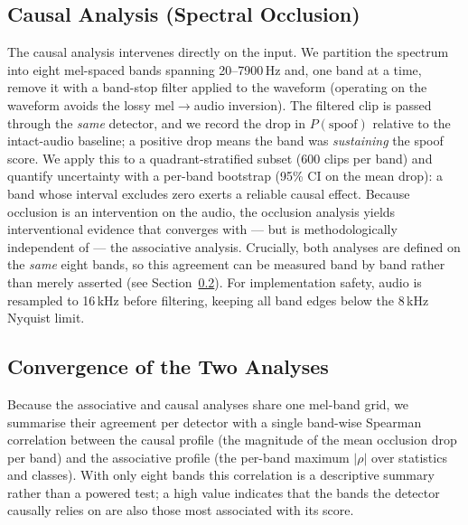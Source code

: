 \documentclass[sigconf]{acmart}
\begin{document}
\subsection{Causal Analysis (Spectral Occlusion)}
\label{subsec:occlusion}
The causal analysis intervenes directly on the input. We partition the spectrum into
eight mel-spaced bands spanning 20--7900\,Hz and, one band at a time, remove it with
a band-stop filter applied to the waveform (operating on the waveform avoids the
lossy mel$\rightarrow$audio inversion). The filtered clip is passed through the
\emph{same} detector, and we record the drop in $P(\mathrm{spoof})$ relative to the
intact-audio baseline; a positive drop means the band was \emph{sustaining} the
spoof score. We apply this to a quadrant-stratified subset (600 clips per band) and
quantify uncertainty with a per-band bootstrap (95\% CI on the mean drop): a band
whose interval excludes zero exerts a reliable causal effect. Because occlusion is
an intervention on the audio, the occlusion analysis yields interventional evidence
that converges with --- but is methodologically independent of --- the associative
analysis. Crucially, both analyses are defined on the \emph{same} eight bands, so
this agreement can be measured band by band rather than merely asserted (see
Section~\ref{subsec:convergence}). For implementation safety, audio is resampled to
16\,kHz before filtering, keeping all band edges below the 8\,kHz Nyquist limit.

\subsection{Convergence of the Two Analyses}
\label{subsec:convergence}
Because the associative and causal analyses share one mel-band grid, we summarise
their agreement per detector with a single band-wise Spearman correlation between the
causal profile (the magnitude of the mean occlusion drop per band) and the
associative profile (the per-band maximum $|\rho|$ over statistics and classes). With
only eight bands this correlation is a descriptive summary rather than a powered
test; a high value indicates that the bands the detector causally relies on are also
those most associated with its score.
\end{document}
